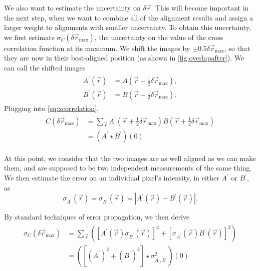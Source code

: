 \documentclass{article}
\begin{document}
We also want to estimate the uncertainty on $\delta\vec{r}$.  This will become important in the next step, when we want to combine all of the alignment results and assign a larger weight to alignments with smaller uncertainty.  To obtain this uncertainty, we first estimate $\sigma_C(\delta\vec{r}_\text{max})$, the uncertainty on the value of the cross correlation function at its maximum.  We shift the images by $\pm0.5\delta\vec{r}_\text{max}$, so that they are now in their best-aligned position (as shown in \cref{fig:overlapafter}).  We can call the shifted images
\begin{align}
\begin{aligned}
A^\prime(\vec{r})&=A\left(\vec{r}-\frac{1}{2}\delta\vec{r}_\text{max}\right), \\
B^\prime(\vec{r})&=B\left(\vec{r}+\frac{1}{2}\delta\vec{r}_\text{max}\right).
\end{aligned}
\end{align}
Plugging into \cref{eq:xcorrelation},
\begin{align}
\begin{aligned}
C(\delta\vec{r}_\text{max})&=\sum_{\vec{r}}A^\prime\left(\vec{r}+\frac{1}{2}\delta\vec{r}_\text{max}\right) B\left(\vec{r}+\frac{1}{2}\delta\vec{r}_\text{max}\right) \\
&=(A^\prime\star B^\prime)(0)
\end{aligned}
\end{align}

At this point, we consider that the two images are as well aligned as we can make them, and are supposed to be two independent measurements of the same thing.  We then estimate the error on an individual pixel's intensity, in either $A^\prime$ or $B^\prime$, as
\begin{equation}
\sigma_{A^\prime}(\vec{r})=\sigma_{B^\prime}(\vec{r})=\left|A^\prime(\vec{r})-B^\prime(\vec{r})\right|.
\label{eq:pixelerror}
\end{equation}

By standard techniques of error propagation, we then derive
\begin{align}
\begin{aligned}
\sigma_C(\delta\vec{r}_\text{max})&=\sum_{\vec{r}}\left(\left[A^\prime(\vec{r})\sigma_{B^\prime}(\vec{r})\right]^2+\left[\sigma_{A^\prime}(\vec{r})B^\prime(\vec{r})\right]^2\right) \\
&=([(A^\prime)^2+(B^\prime)^2]\star\sigma_{A^\prime,B^\prime}^2)(0)
\end{aligned}
\end{align}
\end{document}
